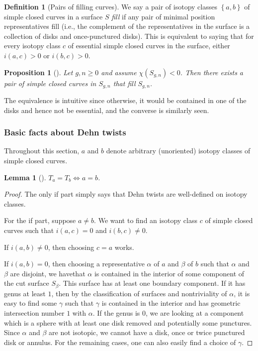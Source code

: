 \documentclass[reqno]{amsart}
\newtheorem{lemma}[theorem]{Lemma}
\newtheorem{proposition}[theorem]{Proposition}
\theoremstyle{definition}
\newtheorem{definition}[theorem]{Definition}
\theoremstyle{remark}
\begin{document}
\begin{definition}[Pairs of filling curves]
    We say a pair of isotopy classes $\left\{ a,b \right\} $ of
    simple closed curves in a surface $S$ \textit{fill} if
    any pair of minimal position representatives
    fill (i.e., the complement of the representatives
    in the surface is a collection of disks and
    once-punctured disks).
    This is equivalent to saying that for every
    isotopy class $c$ of essential simple closed curves
    in the surface, either
    $i \left( a,c \right) >0$ or $i(b,c) > 0$.
\end{definition}

\begin{proposition}[]
    Let $g, n \ge 0$ and assume $\chi \left( S_{g,n} \right) <0$.
    Then there exists a pair of simple closed curves in
    $S_{g,n}$ that fill $S_{g,n}$.
\end{proposition}

The equivalence is intuitive since otherwise, it would be
contained in one of the disks and hence not be essential, and
the converse is similarly seen.


\subsubsection{Basic facts about Dehn twists}

Throughout this section, $a$ and $b$ denote arbitrary
(unoriented) isotopy classes of simple closed curves.

\begin{lemma}[]
    $T_a = T_b \iff a = b$.
\end{lemma}

\begin{proof}
    The only if part simply says that Dehn twists are well-defined
    on isotopy classes.

    For the if part, suppose
    $a \neq b$. We want to find an isotopy class
    $c$ of simple closed curves
    such that $i(a,c) = 0$ and $i(b,c) \neq 0$.

    If $i(a,b) \neq 0$, then
    choosing $c = a$ works.

    If $i(a,b) = 0$, then
    choosing a representative $\alpha$ of $a$ and
    $\beta$ of $b$ such that $\alpha$ and $\beta$ are disjoint,
    we havethat $\alpha$ is contained in the interior of
    some component of the cut surface $S_{\beta}$.
    This surface has at least one boundary component.
    If it has genus at least $1$, then by the classification
    of surfaces and nontriviality of $\alpha$, it is
    easy to find some $\gamma$ such that
    $\gamma$ is contained in the interior and has
    geometric intersection number $1$ with $\alpha$.
    If the genus is $0$, we are looking at a component
    which is a sphere with at least one disk removed and
    potentially some punctures. Since $\alpha$ and 
    $\beta$ are not isotopic, we cannot have
    a disk, once or twice punctured disk or annulus.
    For the remaining cases, one can also easily find a
    choice of $\gamma$.
\end{proof}
\end{document}
